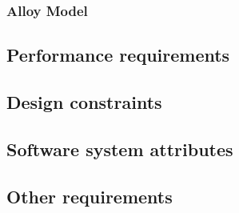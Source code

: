 \subsubsection{Alloy Model}
\subsection{Performance requirements}
\subsection{Design constraints}
\subsection{Software system attributes}
\subsection{Other requirements}
